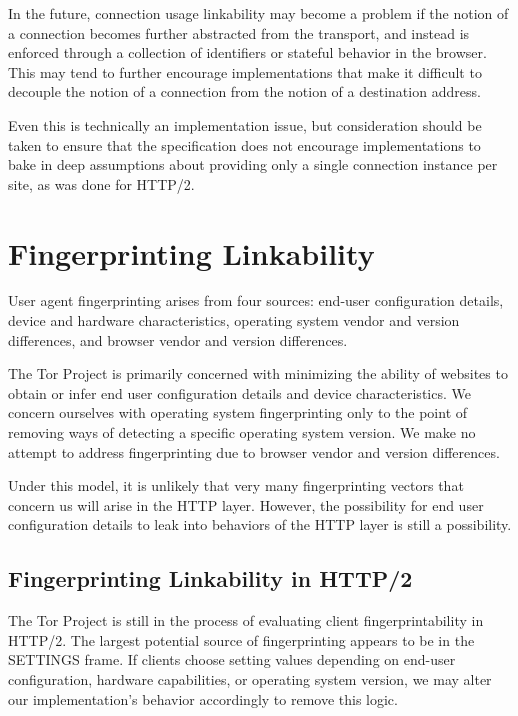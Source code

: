 \documentclass[letterpaper,11pt]{llncs}
\begin{document}
In the future, connection usage linkability may become a problem if the notion
of a connection becomes further abstracted from the transport, and instead is
enforced through a collection of identifiers or stateful behavior in the
browser. This may tend to further encourage implementations that make it
difficult to decouple the notion of a connection from the notion of a
destination address.

Even this is technically an implementation issue, but consideration should be
taken to ensure that the specification does not encourage implementations to
bake in deep assumptions about providing only a single connection instance per
site, as was done for HTTP/2.

\section{Fingerprinting Linkability}

User agent fingerprinting arises from four sources: end-user configuration
details, device and hardware characteristics, operating system vendor and
version differences, and browser vendor and version differences.

The Tor Project is primarily concerned with minimizing the ability of websites
to obtain or infer end user configuration details and device characteristics.
We concern ourselves with operating system fingerprinting only to the point of
removing ways of detecting a specific operating system version. We make no
attempt to address fingerprinting due to browser vendor and version
differences. %

Under this model, it is unlikely that very many fingerprinting vectors that
concern us will arise in the HTTP layer. However, the possibility for end user
configuration details to leak into behaviors of the HTTP layer is still a
possibility.

\subsection{Fingerprinting Linkability in HTTP/2}

The Tor Project is still in the process of evaluating client
fingerprintability in HTTP/2. The largest potential source of fingerprinting
appears to be in the SETTINGS frame. If clients choose setting values
depending on end-user configuration, hardware capabilities, or operating
system version, we may alter our implementation's behavior accordingly to
remove this logic.
\end{document}
